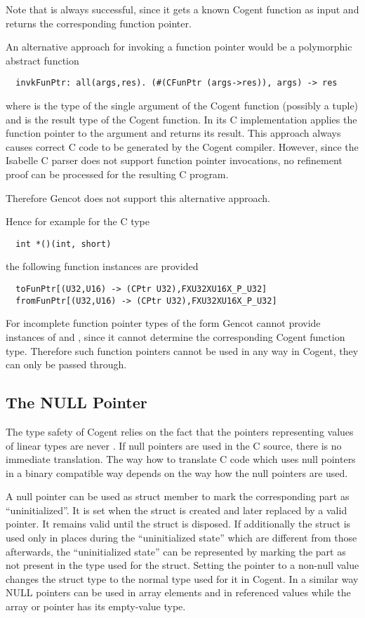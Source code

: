 Note that  is always successful, since it gets a known Cogent function as input and returns 
the corresponding function pointer.

An alternative approach for invoking a function pointer would be a polymorphic abstract function 
\begin{verbatim}
  invkFunPtr: all(args,res). (#(CFunPtr (args->res)), args) -> res
\end{verbatim}
where  is the type of the single argument of the Cogent function (possibly a tuple) and 
is the result type of the Cogent function. In its C implementation  applies the function pointer
to the argument and returns its result. 
This approach always causes correct C code to be generated by the Cogent compiler. However, since the Isabelle
C parser does not support function pointer invocations, no refinement proof can be processed for the resulting
C program.

Therefore Gencot does not support this alternative approach.

Hence for example for the C type
\begin{verbatim}
  int *()(int, short)
\end{verbatim}
the following function instances are provided
\begin{verbatim}
  toFunPtr[(U32,U16) -> (CPtr U32),FXU32XU16X_P_U32]
  fromFunPtr[(U32,U16) -> (CPtr U32),FXU32XU16X_P_U32]
\end{verbatim}

For incomplete function pointer types of the form  Gencot cannot provide instances of
 and , since it cannot determine the corresponding Cogent function type. Therefore
such function pointers cannot be used in any way in Cogent, they can only be passed through.

\subsection{The NULL Pointer}
\label{design-operations-null}

The type safety of Cogent relies on the fact that the pointers representing values of linear types are never .
If null pointers are used in the C source, there is no immediate translation. The way how to translate C code which uses 
null pointers in a binary compatible way depends on the way how the null pointers are used.

A null pointer can be used as struct member  to mark the corresponding part as ``uninitialized''. 
It is set when the struct is created and later
replaced by a valid pointer. It remains valid until the struct is disposed. If additionally the struct is used only in places
during the ``uninitialized state'' which are different from those afterwards, the ``uninitialized state'' can be represented
by marking the part  as not present in the type used for the struct. Setting the pointer to a non-null value 
changes the struct type to the normal type used for it in Cogent. In a similar way NULL pointers can be used in array
elements and in referenced values while the array or pointer has its empty-value type.

